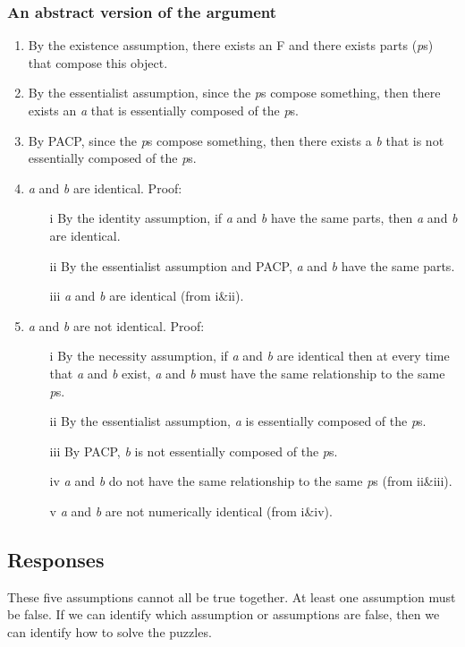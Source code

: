 \documentclass[oneside]{article}
\begin{document}
\subsubsection*{An abstract version of the argument}

\begin{enumerate}
\item By the existence assumption, there exists an F and there exists parts (\emph{p}s) that compose this object. 
\item By the essentialist assumption, since the \emph{p}s compose something, then there exists an \emph{a} that is essentially composed of the \emph{p}s. 
\item By PACP, since the \emph{p}s compose something, then there exists a \emph{b}  that is not essentially composed of the \emph{p}s. 
\item \emph{a} and \emph{b} are identical. Proof: 
\begin{enumerate}
\item[i] By the identity assumption, if \emph{a} and \emph{b} have the same parts, then \emph{a} and \emph{b} are identical. 
\item[ii] By the essentialist assumption and PACP, \emph{a} and \emph{b} have the same parts. 
\item[iii] \emph{a} and \emph{b} are identical (from i\&ii).
\end{enumerate}
\item \emph{a} and \emph{b} are not identical. Proof: 
\begin{enumerate} 
\item[i] By the necessity assumption, if \emph{a} and \emph{b} are identical then at every time that \emph{a} and \emph{b} exist, \emph{a} and \emph{b} must have the same relationship to the same \emph{p}s. 
\item[ii] By the essentialist assumption, \emph{a} is essentially composed of the \emph{p}s. 
\item[iii] By PACP, \emph{b} is not essentially composed of the \emph{p}s. 
\item[iv] \emph{a} and \emph{b} do not have the same relationship to the same \emph{p}s (from ii\&iii).
\item[v] \emph{a} and \emph{b} are not numerically identical (from i\&iv).
\end{enumerate}
\end{enumerate}



\subsection*{Responses} 
These five assumptions cannot all be true together. At least one assumption must be  false. If we can identify which assumption or assumptions are false, then we can  identify how to solve the puzzles. 
\end{document}
